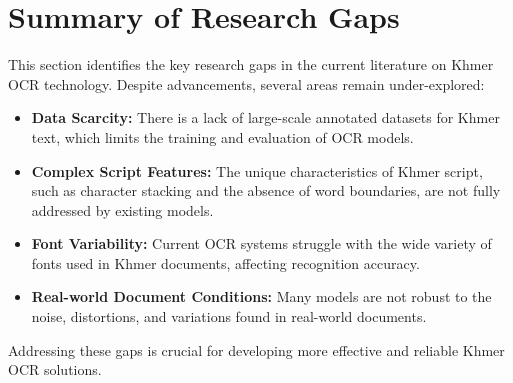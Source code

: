 \section{Summary of Research Gaps}
\label{sec:research-gaps}

This section identifies the key research gaps in the current literature on 
Khmer OCR technology. Despite advancements, several areas remain under-explored:

\begin{itemize}
    \item \textbf{Data Scarcity:} There is a lack of large-scale annotated datasets for Khmer text, which limits the training and evaluation of OCR models.
    \item \textbf{Complex Script Features:} The unique characteristics of Khmer script, such as character stacking and the absence of word boundaries, are not fully addressed by existing models.
    \item \textbf{Font Variability:} Current OCR systems struggle with the wide variety of fonts used in Khmer documents, affecting recognition accuracy.
    \item \textbf{Real-world Document Conditions:} Many models are not robust to the noise, distortions, and variations found in real-world documents.
\end{itemize}

Addressing these gaps is crucial for developing more effective and reliable Khmer OCR solutions.

